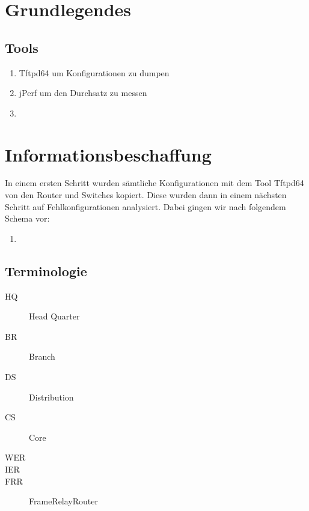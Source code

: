 

\newcommand{\SUBJECT}{Report}
\newcommand{\TITLE}{Cloud Infrastructre Lab 1}







\section{Grundlegendes}
\subsection{Tools}
\begin{enumerate}
	\item Tftpd64 um Konfigurationen zu dumpen
	\item jPerf um den Durchsatz zu messen
	\item %
\end{enumerate}

\section{Informationsbeschaffung}
In einem ersten Schritt wurden sämtliche Konfigurationen mit dem Tool Tftpd64 von den Router und Switches kopiert. Diese wurden dann in einem nächsten Schritt auf Fehlkonfigurationen analysiert. Dabei gingen wir nach folgendem Schema vor:

\begin{enumerate}
	\item 
\end{enumerate}

\subsection{Terminologie}
\begin{description}
	\item[HQ] Head Quarter
	\item[BR] Branch
	\item[DS] Distribution
	\item[CS] Core
	\item[WER] %
	\item[IER] %
	\item[FRR] FrameRelayRouter
\end{description}

